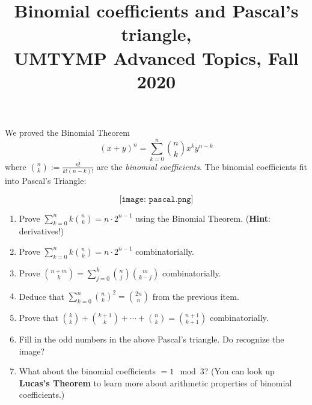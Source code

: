 \documentclass[11pt]{article}
\title{Binomial coefficients and Pascal's triangle, \\UMTYMP Advanced Topics, Fall 2020}
\date{}
\begin{document}
\maketitle

\thispagestyle{empty}

\vspace{-0.5in}

We proved the Binomial Theorem
\[ (x+y)^n = \sum_{k=0}^{n} \binom{n}{k}x^k y^{n-k}\]
where $\binom{n}{k} := \frac{n!}{k!(n-k)!}$ are the \emph{binomial coefficients}. The binomial coefficients fit into Pascal's Triangle:

\[ \texttt{[image: pascal.png]}\]

\medskip


\begin{enumerate}

\item Prove $\sum_{k=0}^{n} k \binom{n}{k} = n \cdot 2^{n-1}$ using the Binomial Theorem. ({\bf Hint}: derivatives!)
\item Prove $\sum_{k=0}^{n} k \binom{n}{k} = n \cdot 2^{n-1}$ combinatorially.
\item Prove $\binom{n+m}{k} = \sum_{j=0}^{k} \binom{n}{j}\binom{m}{k-j}$ combinatorially.
\item Deduce that $\sum_{k=0}^{n} \binom{n}{k}^{2} = \binom{2n}{n}$ from the previous item.
\item Prove that $\binom{k}{k} + \binom{k+1}{k} + \cdots + \binom{n}{k}=\binom{n+1}{k+1}$ combinatorially.

\medskip \medskip

\item Fill in the odd numbers in the above Pascal's triangle. Do recognize the image?

\item What about the binomial coefficients $=1 \mod 3$? (You can look up {\bf Lucas's Theorem} to learn more about arithmetic properties of binomial coefficients.)

\end{enumerate}
\end{document}
